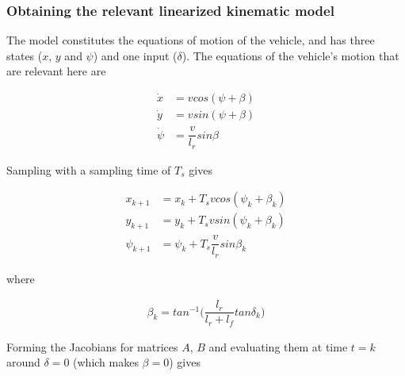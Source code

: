 \begin{figure}[H]\centering
  \scalebox{0.8}{}
  \caption{}
  \label{fig:circular_mp_rotational}
\end{figure}


\subsubsection{Obtaining the relevant linearized kinematic model}

The model constitutes the equations of motion of the vehicle, and has three
states ($x$, $y$ and $\psi$) and one input ($\delta$). The equations of the
vehicle's motion that are relevant here are

\begin{align}
  \dot{x} &= v cos(\psi + \beta) \\
  \dot{y} &= v sin(\psi + \beta) \\
  \dot{\psi} &= \dfrac{v}{l_r} sin\beta
\end{align}

Sampling with a sampling time of $T_s$ gives

\begin{align}
  x_{k+1} &= x_{k} + T_s v cos(\psi_k + \beta_k) \\
  y_{k+1} &= y_{k} + T_s v sin(\psi_k + \beta_k) \\
  \psi_{k+1} &= \psi_{k} + T_s \dfrac{v}{l_r} sin\beta_k
\end{align}

where

\begin{align}
  \beta_k = tan^{-1}\Big(\dfrac{l_r}{l_r + l_f} tan\delta_k\Big)
\end{align}


Forming the Jacobians for matrices $A$, $B$ and evaluating them at time
$t=k$ around $\delta = 0$ (which makes $\beta = 0$) gives

